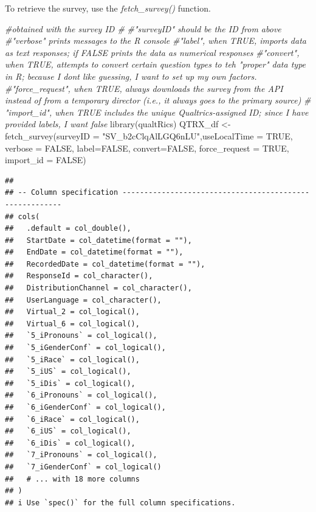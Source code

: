 \documentclass[
  english,
]{book}
\newenvironment{Shaded}{\begin{snugshade}}{\end{snugshade}}
\newcommand{\AttributeTok}[1]{\textcolor[rgb]{0.77,0.63,0.00}{#1}}
\newcommand{\CommentTok}[1]{\textcolor[rgb]{0.56,0.35,0.01}{\textit{#1}}}
\newcommand{\ConstantTok}[1]{\textcolor[rgb]{0.00,0.00,0.00}{#1}}
\newcommand{\FunctionTok}[1]{\textcolor[rgb]{0.00,0.00,0.00}{#1}}
\newcommand{\NormalTok}[1]{#1}
\newcommand{\OtherTok}[1]{\textcolor[rgb]{0.56,0.35,0.01}{#1}}
\newcommand{\StringTok}[1]{\textcolor[rgb]{0.31,0.60,0.02}{#1}}
\begin{document}
To retrieve the survey, use the \emph{fetch\_survey()} function.

\begin{Shaded}
\begin{Highlighting}[]
\CommentTok{\#obtained with the survey ID \#}
\CommentTok{\#"surveyID" should be the ID from above}
\CommentTok{\#"verbose" prints messages to the R console}
\CommentTok{\#"label", when TRUE, imports data as text responses; if FALSE prints the data as numerical responses}
\CommentTok{\#"convert", when TRUE, attempts to convert certain question types to teh "proper" data type in R; because I don\textquotesingle{}t like guessing, I want to set up my own factors.}
\CommentTok{\#"force\_request", when TRUE, always downloads the survey from the API instead of from a temporary director (i.e., it always goes to the primary source)}
\CommentTok{\# "import\_id", when TRUE includes the unique Qualtrics{-}assigned ID; since I have provided labels, I want false}
\FunctionTok{library}\NormalTok{(qualtRics)}
\NormalTok{QTRX\_df }\OtherTok{\textless{}{-}} \FunctionTok{fetch\_survey}\NormalTok{(}\AttributeTok{surveyID =} \StringTok{"SV\_b2cClqAlLGQ6nLU"}\NormalTok{,}\AttributeTok{useLocalTime =} \ConstantTok{TRUE}\NormalTok{,}
                         \AttributeTok{verbose =} \ConstantTok{FALSE}\NormalTok{, }\AttributeTok{label=}\ConstantTok{FALSE}\NormalTok{, }\AttributeTok{convert=}\ConstantTok{FALSE}\NormalTok{, }\AttributeTok{force\_request =} \ConstantTok{TRUE}\NormalTok{, }\AttributeTok{import\_id =} \ConstantTok{FALSE}\NormalTok{)}
\end{Highlighting}
\end{Shaded}

\begin{verbatim}
## 
## -- Column specification --------------------------------------------------------
## cols(
##   .default = col_double(),
##   StartDate = col_datetime(format = ""),
##   EndDate = col_datetime(format = ""),
##   RecordedDate = col_datetime(format = ""),
##   ResponseId = col_character(),
##   DistributionChannel = col_character(),
##   UserLanguage = col_character(),
##   Virtual_2 = col_logical(),
##   Virtual_6 = col_logical(),
##   `5_iPronouns` = col_logical(),
##   `5_iGenderConf` = col_logical(),
##   `5_iRace` = col_logical(),
##   `5_iUS` = col_logical(),
##   `5_iDis` = col_logical(),
##   `6_iPronouns` = col_logical(),
##   `6_iGenderConf` = col_logical(),
##   `6_iRace` = col_logical(),
##   `6_iUS` = col_logical(),
##   `6_iDis` = col_logical(),
##   `7_iPronouns` = col_logical(),
##   `7_iGenderConf` = col_logical()
##   # ... with 18 more columns
## )
## i Use `spec()` for the full column specifications.
\end{verbatim}
\end{document}
